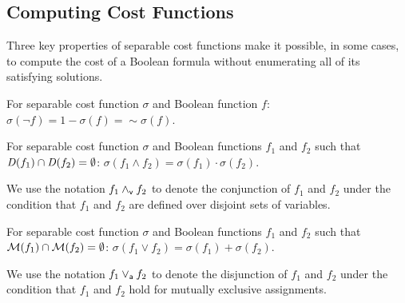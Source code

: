 \documentclass{llncs}
\newcommand{\pand}{\mathbin{\land_{\sf v}}}
\newcommand{\por}{\mathbin{\lor_{\sf a}}}
\newcommand{\tautology}{1}
\newcommand{\nil}{0}
\newcommand{\pite}{\mbox{\it ITE}_{\sf v}}
\newcommand{\oneminus}{{\sim}}
\newcommand{\interpset}[1]{{\cal M}(#1)}
\newcommand{\cost}{\sigma}
\newcommand{\depend}{{\it D}}
\begin{document}
\subsection{Computing Cost Functions}

Three key properties of separable cost functions make it possible, in
some cases, to compute the cost of a Boolean formula without
enumerating all of its satisfying solutions.


\begin{proposition}[Negation]
\label{prop:negation}
  For separable cost function $\cost$ and Boolean function $f$:
  $\cost(\neg f) = 1 - \cost(f) = \oneminus \cost(f)$.
\end{proposition}

\begin{proposition}
\label{prop:conjunction}
  For separable cost function $\cost$ and Boolean functions $f_1$ and $f_2$ such that $\depend(f_1) \cap \depend(f_2) = \emptyset$:
    $\cost(f_1 \land f_2) = \cost(f_1) \cdot \cost(f_2)$.
\end{proposition}
We use the notation $f_1 \pand f_2$ to denote the conjunction of $f_1$ and
$f_2$ under the condition that $f_1$ and $f_2$ are defined over
disjoint sets of variables.

\begin{proposition}
\label{prop:disjunction}
  For separable cost function $\cost$ and Boolean functions $f_1$ and $f_2$ such that $\interpset{f_1} \cap \interpset{f_2} = \emptyset$:
    $\cost(f_1 \lor f_2) = \cost(f_1) + \cost(f_2)$.
\end{proposition}
We use the notation $f_1 \por f_2$ to denote the disjunction of $f_1$ and $f_2$ under the
condition that $f_1$ and $f_2$ hold for mutually exclusive assignments.




\end{document}
